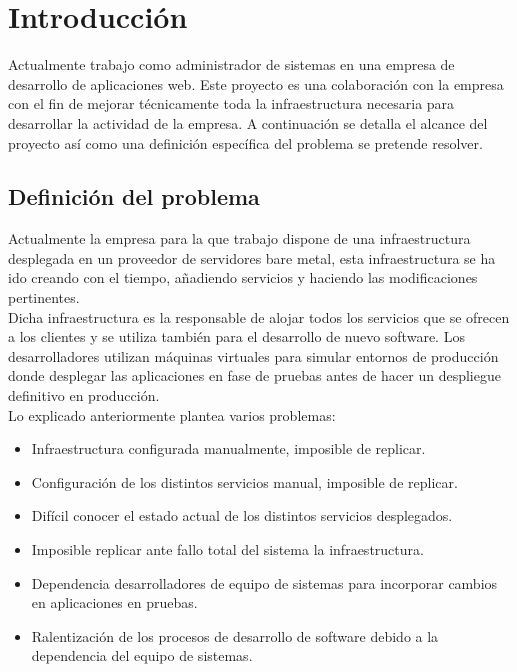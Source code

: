 \chapter {Introducción}
	\begin{paragraph}
		Actualmente trabajo como administrador de sistemas en una empresa de desarrollo de aplicaciones web. Este proyecto es una colaboración con la empresa con el fin de mejorar técnicamente toda la infraestructura necesaria para desarrollar la actividad de la empresa. A continuación se detalla el alcance del proyecto así como una definición específica del problema se pretende resolver.
	\end{paragraph}
\section{Definición del problema}
	\begin{text}
		Actualmente la empresa para la que trabajo dispone de una infraestructura desplegada en un proveedor de servidores bare metal, esta infraestructura se ha ido creando con el tiempo, añadiendo servicios y haciendo las modificaciones pertinentes. \\
		Dicha infraestructura es la responsable de alojar todos los servicios que se ofrecen a los clientes y se utiliza también para el desarrollo de nuevo software. Los desarrolladores utilizan máquinas virtuales para simular entornos de producción donde desplegar las aplicaciones en fase de pruebas antes de hacer un despliegue definitivo en producción. \\
		Lo explicado anteriormente plantea varios problemas:
		\begin{itemize}
			\item Infraestructura configurada manualmente, imposible de replicar.
			\item Configuración de los distintos servicios manual, imposible de replicar. 
			\item Difícil conocer el estado actual de los distintos servicios desplegados. 
			\item Imposible replicar ante fallo total del sistema la infraestructura.
			\item Dependencia desarrolladores de equipo de sistemas para incorporar cambios en aplicaciones en pruebas.
			\item Ralentización de los procesos de desarrollo de software debido a la dependencia del equipo de sistemas.
		\end{itemize}
	\end{text}

